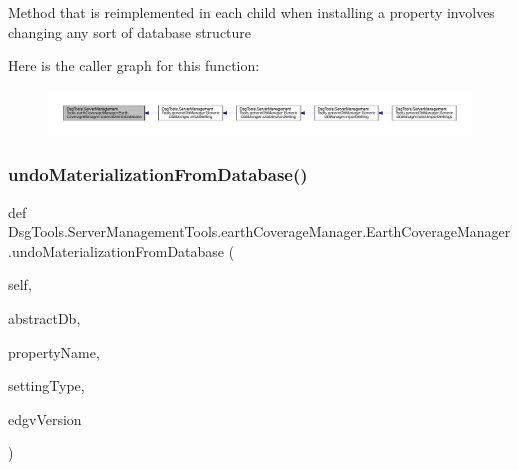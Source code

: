 \begin{DoxyVerb}Method that is reimplemented in each child when installing a property involves changing any sort of database structure
\end{DoxyVerb}
 Here is the caller graph for this function\+:
\nopagebreak
\begin{figure}[H]
\begin{center}
\leavevmode
\includegraphics[width=350pt]{class_dsg_tools_1_1_server_management_tools_1_1earth_coverage_manager_1_1_earth_coverage_manager_ad06d5264ccd27c99fe7b995d6d6fa2d3_icgraph}
\end{center}
\end{figure}
\mbox{\label{class_dsg_tools_1_1_server_management_tools_1_1earth_coverage_manager_1_1_earth_coverage_manager_a57d96153e643d66180678145e086b07a}} 
\subsubsection{\texorpdfstring{undo\+Materialization\+From\+Database()}{undoMaterializationFromDatabase()}}
{\footnotesize\ttfamily def Dsg\+Tools.\+Server\+Management\+Tools.\+earth\+Coverage\+Manager.\+Earth\+Coverage\+Manager.\+undo\+Materialization\+From\+Database (\begin{DoxyParamCaption}\item[{}]{self,  }\item[{}]{abstract\+Db,  }\item[{}]{property\+Name,  }\item[{}]{setting\+Type,  }\item[{}]{edgv\+Version }\end{DoxyParamCaption})}

